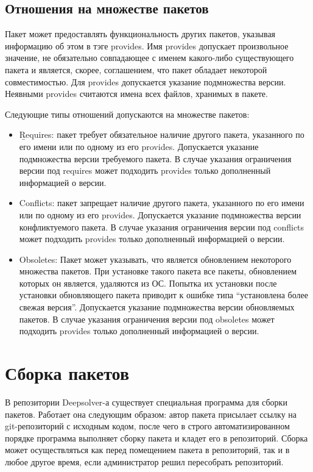 \subsection {Отношения на множестве пакетов}
Пакет может предоставлять функциональность других пакетов, указывая
информацию об этом в тэге provides. Имя provides допускает произвольное
значение, не обязательно совпадающее с именем какого-либо существующего
 пакета и является, скорее, соглашением, что пакет обладает некоторой
совместимостью. Для provides допускается указание подмножества версии.
Неявными provides считаются имена всех файлов, хранимых в пакете.

Следующие типы отношений допускаются на множестве пакетов:
\begin{itemize}
\item{\b Requires: пакет требует обязательное наличие другого пакета, указанного
по его имени или по одному из его provides. Допускается указание 
подмножества версии требуемого пакета. В случае указания ограничения версии
под requires может подходить provides только дополненный информацией
о версии.}
\item{Conflicts: пакет запрещает наличие другого пакета, указанного по его имени
 или по одному из его provides. Допускается указание подмножества
версии конфликтуемого пакета. В случае указания ограничения версии
под conflicts может подходить provides только дополненный информацией
о версии.}
\item{Obsoletes: Пакет может указывать, что является обновлением некоторого
множества пакетов. При установке такого пакета все пакеты, обновлением
которых он является, удаляются из ОС. Попытка их установки после
установки обновляющего пакета приводит к ошибке типа “установлена
более свежая версия”. Допускается указание подмножества версии обновляемых
пакетов. В случае указания ограничения версии под obsoletes может
подходить provides только дополненный информацией о версии.}
\end{itemize}

\section{Сборка пакетов}
В репозитории Deepsolver-а существует специальная программа для сборки пакетов. Работает
она следующим образом: автор пакета присылает ссылку на git-репозиторий с исходным кодом, %
после чего в строго автоматизированном порядке программа выполняет сборку пакета и кладет
его в репозиторий. Сборка может осуществляться как перед помещением пакета в репозиторий,
так и в любое другое время, если администратор решил пересобрать репозиторий.

